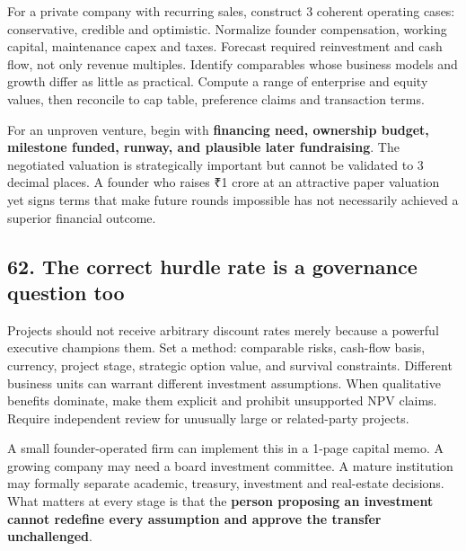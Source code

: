 For a private company with recurring sales, construct 3 coherent operating cases: conservative, credible and optimistic. Normalize founder compensation, working capital, maintenance capex and taxes. Forecast required reinvestment and cash flow, not only revenue multiples. Identify comparables whose business models and growth differ as little as practical. Compute a range of enterprise and equity values, then reconcile to cap table, preference claims and transaction terms.

For an unproven venture, begin with \textbf{financing need, ownership budget, milestone funded, runway, and plausible later fundraising}. The negotiated valuation is strategically important but cannot be validated to 3 decimal places. A founder who raises ₹1 crore at an attractive paper valuation yet signs terms that make future rounds impossible has not necessarily achieved a superior financial outcome.

\subsection{62. The correct hurdle rate is a governance question too}


Projects should not receive arbitrary discount rates merely because a powerful executive champions them. Set a method: comparable risks, cash-flow basis, currency, project stage, strategic option value, and survival constraints. Different business units can warrant different investment assumptions. When qualitative benefits dominate, make them explicit and prohibit unsupported NPV claims. Require independent review for unusually large or related-party projects.

A small founder-operated firm can implement this in a 1-page capital memo. A growing company may need a board investment committee. A mature institution may formally separate academic, treasury, investment and real-estate decisions. What matters at every stage is that the \textbf{person proposing an investment cannot redefine every assumption and approve the transfer unchallenged}.

